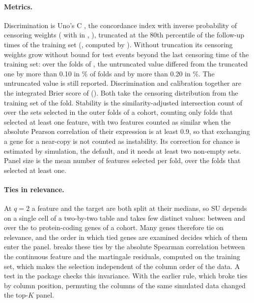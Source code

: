 \paragraph{Metrics.} Discrimination is Uno's C \citep{uno2011}, the concordance index
with inverse probability of censoring weights ( with
 in , \citealp{sonabend2021}), truncated at
the 80th percentile of the follow-up times of the training set (, computed
by ). Without truncation its censoring weights grow without bound
for test events beyond the last censoring time of the training set: over the
\SuppTruncFolds{} folds of , the untruncated value differed from
the truncated one by more than 0.10 in \SuppTruncOffTen\% of folds and by more than 0.20
in \SuppTruncOffTwenty\%. The untruncated value is still reported. Discrimination and
calibration together are the integrated Brier score of \citet{graf1999}
(). Both take the censoring distribution from the training set of the
fold. Stability is the similarity-adjusted intersection count of
 \citep{bommert2021stabm} over the sets selected in the outer folds of a
cohort, counting only folds that selected at least one feature, with two
features counted as similar when the absolute Pearson correlation of their expression is
at least 0.9, so that exchanging a gene for a near-copy is not counted as instability.
Its correction for chance is estimated by simulation, the  default, and it
needs at least two non-empty sets. Panel size is the mean number of features selected per
fold, over the folds that selected at least one.

\paragraph{Ties in relevance.} At $q = 2$ a feature and the target are both split at
their medians, so SU depends on a single cell of a two-by-two table and takes few
distinct values: between \SuppDistinctSuMin{} and \SuppDistinctSuMax{} over the
\SuppCodingMin{} to \SuppCodingMax{} protein-coding genes of a cohort. Many genes therefore
tie on relevance, and the order in which tied genes are examined decides which of them
enter the panel.  breaks these ties by the absolute Spearman correlation
between the continuous feature and the martingale residuals, computed on the training
set, which makes the selection independent of the column order of the data. A test in
the package checks this invariance. With the earlier rule, which broke ties by column
position, permuting the columns of the same simulated data changed the top-$K$ panel.

